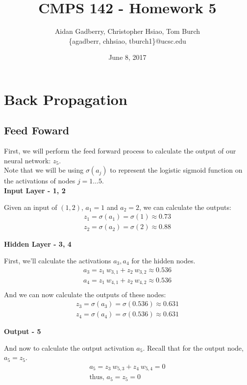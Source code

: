 \documentclass[11pt]{article}
\title{CMPS 142 - Homework 5}
\author{Aidan Gadberry, Christopher Hsiao, Tom Burch\\ \{agadberr, chhsiao, tburch1\}@ucsc.edu}
\date{June 8, 2017}
\begin{document}
\maketitle

\section{Back Propagation}
\subsection{Feed Foward}
First, we will perform the feed forward process to calculate the output of our neural network: $z_5$.\\
Note that we will be using $\sigma(a_j)$ to represent the logistic sigmoid function on the activations of nodes $j = 1... 5$.\\

\textbf{Input Layer - 1, 2}\\
\begin{center}
Given an input of $(1, 2)$, $a_1 = 1$ and $a_2 = 2$, we can calculate the outputs:
\begin{gather*}
z_1 = \sigma(a_1) = \sigma(1) \approx 0.73 \\
z_2 = \sigma(a_2) = \sigma(2) \approx 0.88
\end{gather*}
\end{center}

\textbf{Hidden Layer - 3, 4}
\begin{center}
First, we'll calculate the activations $a_3, a_4$ for the hidden nodes.
\begin{gather*}
a_3 = z_1 \ w_{3,1}  + z_2 \ w_{3,2} \approx 0.536\\
a_4 = z_1 \ w_{4,1}  + z_2 \ w_{4,2} \approx 0.536\\
\end{gather*}
And we can now calculate the outputs of these nodes:
\begin{gather*}
z_3 = \sigma(a_3) = \sigma(0.536) \approx 0.631\\
z_4 = \sigma(a_4) = \sigma(0.536) \approx 0.631
\end{gather*}
\end{center}

\textbf{Output - 5}
\begin{center}
And now to calculate the output activation $a_5$. Recall that for the output node, $a_5 = z_5$.
\begin{gather*}
a_5 = z_3 \ w_{5,3} + z_4 \ w_{5, 4} = 0\\
\text{thus, } a_5 = z_5 = 0
\end{gather*}
\end{center}
\end{document}
